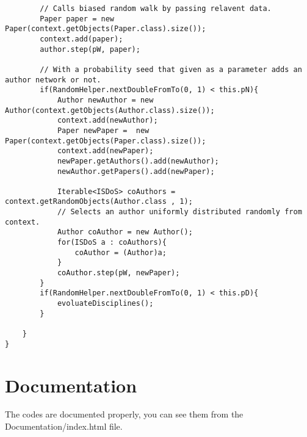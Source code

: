 \begin{lstlisting}
		// Calls biased random walk by passing relavent data.
		Paper paper = new Paper(context.getObjects(Paper.class).size());
		context.add(paper);
		author.step(pW, paper);
		
		// With a probability seed that given as a parameter adds an author network or not.
		if(RandomHelper.nextDoubleFromTo(0, 1) < this.pN){
			Author newAuthor = new Author(context.getObjects(Author.class).size());
			context.add(newAuthor);
			Paper newPaper =  new Paper(context.getObjects(Paper.class).size());
			context.add(newPaper);
			newPaper.getAuthors().add(newAuthor);
			newAuthor.getPapers().add(newPaper);
			
			Iterable<ISDoS> coAuthors = context.getRandomObjects(Author.class , 1);
			// Selects an author uniformly distributed randomly from context.
			Author coAuthor = new Author();
			for(ISDoS a : coAuthors){
				coAuthor = (Author)a;
			}
			coAuthor.step(pW, newPaper);
		}
		if(RandomHelper.nextDoubleFromTo(0, 1) < this.pD){
			evoluateDisciplines();
		}
		
	}
}
\end{lstlisting}

\section{Documentation}
The codes are documented properly, you can see them from the Documentation/index.html file.

\newpage
